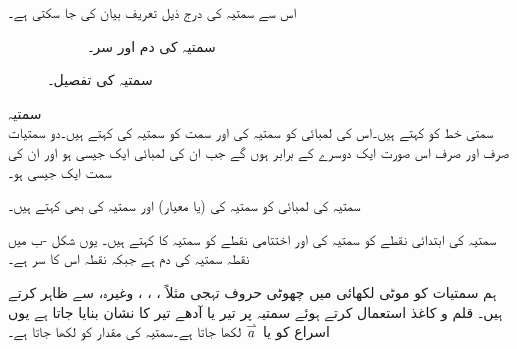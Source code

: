 اس سے سمتیہ کی درج ذیل تعریف بیان کی جا سکتی ہے۔
\begin{figure}
\centering
\begin{subfigure}{0.45\textwidth}
\centering
{}
\caption{}
\end{subfigure} \hfill
\begin{subfigure}{0.45\textwidth}
\centering
{}
\caption{ سمتیہ کی دم اور  سر۔}
\end{subfigure} \hfill
\caption{سمتیہ کی تفصیل۔}
\label{شکل_الجبرا_قوت_سمتی_رفتار}
\end{figure}
\quad سمتیہ\\
سمتی خط کو  کہتے ہیں۔اس کی لمبائی کو سمتیہ کی  اور سمت کو سمتیہ کی  کہتے ہیں۔دو سمتیات صرف اور صرف اس صورت ایک دوسرے کے برابر ہوں گے جب ان کی لمبائی ایک جیسی ہو اور ان کی سمت ایک جیسی ہو۔

سمتیہ کی لمبائی کو سمتیہ کی  (یا معیار) اور سمتیہ کی  بھی کہتے ہیں۔

سمتیہ کی ابتدائی نقطے کو سمتیہ کی  اور اختتامی نقطے کو سمتیہ کا  کہتے ہیں۔ یوں شکل -ب میں نقطہ  سمتیہ  کی دم  ہے جبکہ نقطہ  اس کا سر  ہے۔

ہم سمتیات کو موٹی لکھائی میں چھوٹی حروف تہجی مثلاً ، ، ، وغیرہ،  سے ظاہر کرتے ہیں۔ قلم و کاغذ استعمال کرتے ہوئے سمتیہ پر تیر  یا آدھے تیر کا نشان بنایا جاتا ہے یوں اسراع کو  یا  
$\overset{\rightharpoonup}{\rule{0pt}{.9ex}\smash{a}}$
لکھا جاتا ہے۔سمتیہ  کی مقدار کو  لکھا جاتا ہے۔

